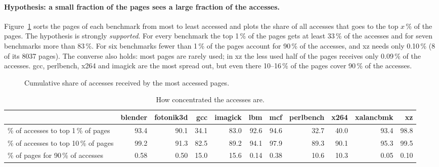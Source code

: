 \documentclass[11pt,a4paper]{article}
\newcommand{\addbench}[1]{%
  \addplot table[x index=0, y=blender]{#1}; \addplot table[x index=0, y=fotonik3d]{#1};
  \addplot table[x index=0, y=gcc]{#1};     \addplot table[x index=0, y=imagick]{#1};
  \addplot table[x index=0, y=lbm]{#1};     \addplot table[x index=0, y=mcf]{#1};
  \addplot table[x index=0, y=perlbench]{#1}; \addplot table[x index=0, y=x264]{#1};
  \addplot table[x index=0, y=xalancbmk]{#1}; \addplot table[x index=0, y=xz]{#1};
  \legend{blender,fotonik3d,gcc,imagick,lbm,mcf,perlbench,x264,xalancbmk,xz}}
\begin{document}
\paragraph{Hypothesis: a small fraction of the pages sees a large fraction of the accesses.}
Figure~\ref{fig:lorenz} sorts the pages of each benchmark from most to least accessed and plots the
share of all accesses that goes to the top $x$\,\% of the pages. The hypothesis is strongly
\emph{supported}. For every benchmark the top 1\,\% of the pages gets at least 33\,\% of the
accesses and for seven benchmarks more than 83\,\%. For six benchmarks fewer than 1\,\% of the
pages account for 90\,\% of the accesses, and xz needs only 0.10\,\% (8 of its 8037 pages). The
converse also holds: most pages are rarely used; in xz the less used half of the pages receives only
0.09\,\% of the accesses. gcc, perlbench, x264 and imagick are the most spread out, but even there
10--16\,\% of the pages cover 90\,\% of the accesses.

\begin{figure}[H]
\centering
{}
\caption{Cumulative share of accesses received by the most accessed pages.}
\label{fig:lorenz}
\end{figure}

\begin{table}[H]
\centering\footnotesize
\setlength{\tabcolsep}{3pt}
\begin{tabular}{@{}lrrrrrrrrrr@{}}
\toprule
& blender & fotonik3d & gcc & imagick & lbm & mcf & perlbench & x264 & xalancbmk & xz \\
\midrule
\% of accesses to top 1\,\% of pages & 93.4 & 90.1 & 34.1 & 83.0 & 92.6 & 94.6 & 32.7 & 40.0 & 93.4 & 98.8 \\
\% of accesses to top 10\,\% of pages & 99.2 & 91.3 & 82.5 & 89.2 & 94.1 & 97.9 & 89.3 & 90.1 & 95.3 & 99.5 \\
\% of pages for 90\,\% of accesses & 0.58 & 0.50 & 15.0 & 15.6 & 0.14 & 0.38 & 10.6 & 10.3 & 0.05 & 0.10 \\
\bottomrule
\end{tabular}
\caption{How concentrated the accesses are.}
\label{tab:conc}
\end{table}
\end{document}
